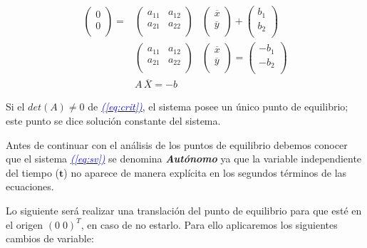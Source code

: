 \documentclass[12pt,a4paper]{report} %
\newcommand{\eref}[1]{\hyperref[#1]{\textcolor{blue}{\textit{(\ref*{#1})}}}}
\begin{document}
	\begin{eqnarray}
		\label{eq:crit}
			\begin{pmatrix}
				0\\
				0\\
			\end{pmatrix} =
			&\begin{pmatrix}
				a_{11} & a_{12}\\
				a_{21} & a_{22}\\
			\end{pmatrix}&
			\begin{pmatrix}
				\overline{x}\\
				\overline{y}\\
			\end{pmatrix} + 
			\begin{pmatrix}
				b_1\\
				b_2\\
			\end{pmatrix}\nonumber \\[4mm]
			&\begin{pmatrix}
			a_{11} & a_{12}\\
			a_{21} & a_{22}\\
			\end{pmatrix}&
			\begin{pmatrix}
			\overline{x}\\
			\overline{y}\\
			\end{pmatrix} = 
			\begin{pmatrix}
			-b_1\\
			-b_2\\
			\end{pmatrix} \nonumber \\[4mm]
			&A\,\overline{X}=-b
	\end{eqnarray}\smallskip
	
	\noindent Si el $det(A)\neq0$ de \eref{eq:crit}, el sistema posee un único punto de equilibrio; este punto se dice solución constante del sistema.
    
    \vspace{0.5cm}Antes de continuar con el análisis de los puntos de equilibrio debemos conocer que el sistema \eref{eq:sv} se denomina \textit{\textbf{Autónomo}} ya que la variable independiente del tiempo ($\bm{t}$) no aparece de manera explícita en los segundos términos de las ecuaciones.
    
    \vspace{0.5cm}\noindent Lo siguiente será realizar una translación del punto de equilibrio para que esté en el origen $(0\; 0)^T$, en caso de no estarlo. Para ello aplicaremos los siguientes cambios de variable:
    
\end{document}
